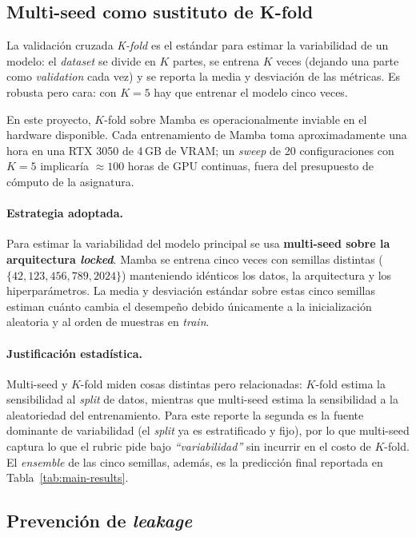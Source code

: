 \documentclass[11pt,a4paper]{article}
\begin{document}
\subsection{Multi-seed como sustituto de K-fold}
\label{subsec:multi-seed}

La validación cruzada \textit{K-fold} es el estándar para estimar la
variabilidad de un modelo: el \textit{dataset} se divide en $K$ partes,
se entrena $K$ veces (dejando una parte como \textit{validation} cada
vez) y se reporta la media y desviación de las métricas. Es robusta
pero cara: con $K=5$ hay que entrenar el modelo cinco veces.

En este proyecto, $K$-fold sobre Mamba es operacionalmente inviable
en el hardware disponible. Cada entrenamiento de Mamba toma
aproximadamente una hora en una RTX 3050 de 4\,GB de VRAM; un
\textit{sweep} de 20 configuraciones con $K=5$ implicaría
$\approx 100$ horas de GPU continuas, fuera del presupuesto de
cómputo de la asignatura.

\paragraph{Estrategia adoptada.}
Para estimar la variabilidad del modelo principal se usa
\textbf{multi-seed sobre la arquitectura \textit{locked}}. Mamba se
entrena cinco veces con semillas distintas
($\{42, 123, 456, 789, 2024\}$) manteniendo idénticos los datos, la
arquitectura y los hiperparámetros. La media y desviación estándar
sobre estas cinco semillas estiman cuánto cambia el desempeño debido
únicamente a la inicialización aleatoria y al orden de muestras en
\textit{train}.

\paragraph{Justificación estadística.}
Multi-seed y $K$-fold miden cosas distintas pero relacionadas: $K$-fold
estima la sensibilidad al \textit{split} de datos, mientras que
multi-seed estima la sensibilidad a la aleatoriedad del entrenamiento.
Para este reporte la segunda es la fuente dominante de variabilidad
(el \textit{split} ya es estratificado y fijo), por lo que multi-seed
captura lo que el rubric pide bajo \textit{``variabilidad''} sin
incurrir en el costo de $K$-fold. El \textit{ensemble} de las cinco
semillas, además, es la predicción final reportada en
Tabla~\ref{tab:main-results}.

\subsection{Prevención de \textit{leakage}}
\label{subsec:leakage-prevention}
\end{document}
